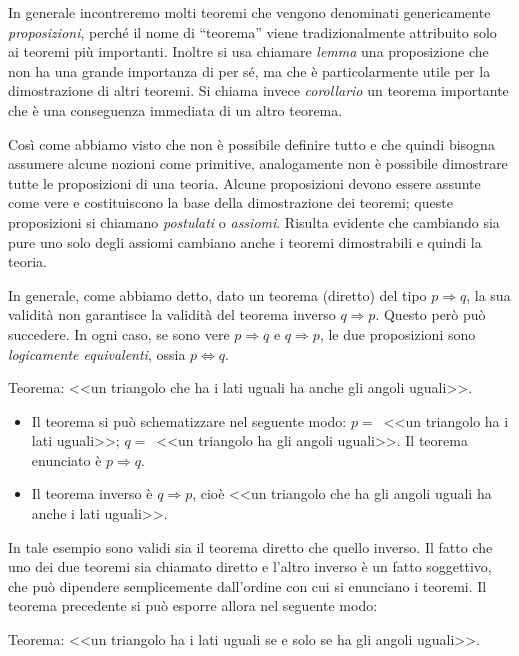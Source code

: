 In generale incontreremo molti teoremi che vengono denominati 
genericamente \emph{proposizioni}, perché il nome di ``teorema'' 
viene tradizionalmente attribuito solo ai teoremi più importanti. 
Inoltre si usa chiamare \emph{lemma} una proposizione che non ha una 
grande importanza di per sé, ma che è particolarmente utile per la 
dimostrazione di altri teoremi. Si chiama invece \emph{corollario} un 
teorema importante che è una conseguenza immediata di un altro 
teorema.

Così come abbiamo visto che non è possibile definire tutto e che 
quindi bisogna assumere alcune nozioni come primitive, analogamente 
non è possibile dimostrare tutte le proposizioni di una teoria. 
Alcune proposizioni devono essere assunte come vere e costituiscono la 
base della dimostrazione dei teoremi; queste proposizioni si chiamano 
\emph{postulati} o \emph{assiomi}. Risulta evidente che cambiando sia 
pure uno solo degli assiomi cambiano anche i teoremi dimostrabili e 
quindi la teoria.

In generale, come abbiamo detto, dato un teorema (diretto) del tipo 
$p\Rightarrow q$, la sua validità non garantisce la validità del 
teorema inverso $q\Rightarrow p$. Questo però può succedere. In ogni 
caso, se sono vere $p\Rightarrow q$ e $q\Rightarrow p$, le due 
proposizioni sono \emph{logicamente equivalenti}, ossia 
$p\Leftrightarrow q$.
\begin{exrig}
\begin{esempio}
Teorema: <<un triangolo che ha i lati uguali ha anche gli angoli 
uguali>>.
\begin{itemize}
\item Il teorema si può schematizzare nel seguente modo: $p=$~<<un 
triangolo ha i lati uguali>>; $q=$~<<un triangolo ha gli angoli 
uguali>>. Il teorema enunciato è $p\Rightarrow q$.
\item  Il teorema inverso è  $q\Rightarrow p$, cioè <<un triangolo 
che ha gli angoli uguali ha anche i lati uguali>>.
\end{itemize}
In tale esempio sono validi sia il teorema diretto che quello 
inverso. Il fatto che uno dei due teoremi sia chiamato diretto e 
l'altro inverso è un fatto soggettivo, che può dipendere 
semplicemente dall'ordine con cui si enunciano i teoremi.
Il teorema precedente si può esporre allora nel seguente modo:
\item Teorema: <<un triangolo ha i lati uguali se e solo se ha gli 
angoli uguali>>.
\end{esempio}
\end{exrig}

